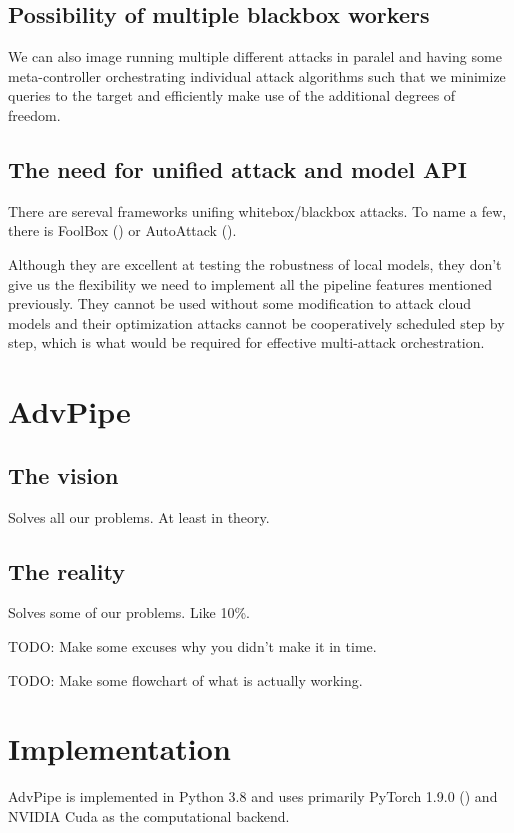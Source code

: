 \subsection{Possibility of multiple blackbox workers}
We can also image running multiple different attacks in paralel and having some meta-controller orchestrating individual attack algorithms such that we minimize queries to the target and efficiently make use of the additional degrees of freedom.


\subsection{The need for unified attack and model API}
There are sereval frameworks unifing whitebox/blackbox attacks. To name a few, there is 
FoolBox (\cite{Rauber2020FoolboxNF}) or AutoAttack (\cite{croce2020reliable}). 

Although they are excellent at testing the robustness of local models, they don't give us the flexibility we need to implement all the pipeline features mentioned previously. They cannot be used without some modification to attack cloud models and their optimization attacks cannot be cooperatively scheduled step by step, which is what would be required for effective multi-attack orchestration.

\section{AdvPipe}

\subsection{The vision}
Solves all our problems. At least in theory.

\subsection{The reality}
Solves some of our problems. Like 10\%.

TODO: Make some excuses why you didn't make it in time.

TODO: Make some flowchart of what is actually working.


\section{Implementation}
AdvPipe is implemented in Python 3.8 and uses primarily PyTorch 1.9.0 (\cite{paszke2019pytorch}) and NVIDIA Cuda as the computational backend.

